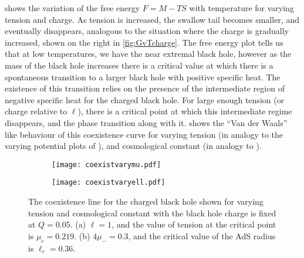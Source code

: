 \documentclass[
twoside,
openright,
frontopenright,
]{dmathesis}
\begin{document}
 shows the variation of the free energy $F=M-TS$ with
temperature for varying tension and charge. As tension is increased, the
swallow tail becomes smaller, and eventually disappears, analogous to the
situation where the charge is gradually increased, shown on the right in
\cref{fig:GvTcharge}. The free energy plot tells us that at low temperatures, we
have the near extremal black hole, however as the mass of the black hole
increases there is a critical value at which there is a spontaneous transition
to a larger black hole with positive specific heat. The existence of this
transition relies on the presence of the intermediate region of negative
specific heat for the charged black hole.  For large enough tension (or charge
relative to $\ell$), there is a critical point at which this intermediate
regime disappears, and the phase transition along with it. 
shows the ``Van der Waals'' like behaviour of this coexistence curve for varying
tension (in analogy to the varying potential plots of \cite{Chamblin:1999tk}),
and cosmological constant (in analogy to \cite{Kubiznak:2012wp}).
\begin{figure}
  \centering
  \begin{subfigure}[b]{0.45\textwidth}
    \texttt{[image: coexistvarymu.pdf]}
    \caption{\label{fig:coexista}}
  \end{subfigure}\quad
  \begin{subfigure}[b]{0.45\textwidth}
    \texttt{[image: coexistvaryell.pdf]}
    \caption{\label{fig:coexistb}}
  \end{subfigure}
  \caption{\label{fig:coexist}The coexistence line for the charged black hole
    shown for varying tension and cosmological constant with the black hole
    charge is fixed at $Q=0.05$. (a) $\ell=1$, and the value of tension
    at the critical point is $\mu_\mathrm{c} = 0.219$. (b) $4\mu_- = 0.3$, and
    the critical value of the AdS radius is $\ell_\mathrm{c} = 0.36$.}
\end{figure}
\end{document}
